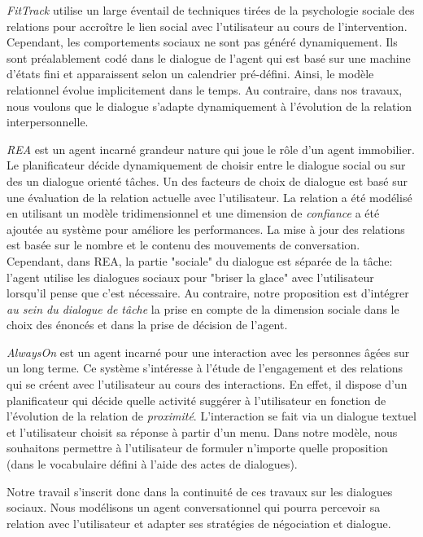 \documentclass [french]{sig-alternate-05-2015}
\begin{document}
\textit{FitTrack} \cite{bickmore2005s} utilise un large éventail de techniques tirées de la psychologie sociale des relations pour accroître le lien social avec l'utilisateur au cours de l'intervention. Cependant, les comportements sociaux ne sont pas généré dynamiquement. Ils sont préalablement codé dans le dialogue de l'agent qui est basé sur une machine d'états fini et apparaissent selon un calendrier pré-défini. Ainsi, le modèle relationnel évolue implicitement dans le temps. Au contraire, dans nos travaux, nous voulons que le dialogue s'adapte dynamiquement à l'évolution de la relation interpersonnelle.

\textit{REA} \cite{bickmore2005establishing} est un agent incarné grandeur nature qui joue le rôle d'un agent immobilier. Le planificateur décide dynamiquement de choisir entre le dialogue social ou sur des un dialogue orienté tâches. Un des facteurs de choix de dialogue est basé sur une évaluation de la relation actuelle avec l'utilisateur. La relation a été modélisé en utilisant un modèle tridimensionnel \cite{svennevig2000getting} et une dimension de \textit{confiance} a été ajoutée au système pour améliore les performances. La mise à jour des relations est basée sur le nombre et le contenu des mouvements de conversation. Cependant, dans REA, la partie "sociale" du dialogue est séparée de la tâche: l'agent utilise les dialogues sociaux pour "briser la glace" avec l'utilisateur lorsqu'il pense que c'est nécessaire. Au contraire, notre proposition est d'intégrer \textit{au sein du dialogue de tâche} la prise en compte de la dimension sociale dans le choix des énoncés et dans la prise de décision de l'agent.

\textit{AlwaysOn} \cite{sidner2013always} est un agent incarné pour une interaction avec les personnes âgées sur un long terme. Ce système s'intéresse à l'étude de l'engagement et des relations qui se créent avec l'utilisateur au cours des interactions. En effet, il dispose d'un planificateur qui décide quelle activité suggérer à l'utilisateur en fonction de l'évolution de la relation de \textit{proximité}. L'interaction se fait via un dialogue textuel et l'utilisateur choisit sa réponse à partir d'un menu. Dans notre modèle, nous souhaitons permettre à l'utilisateur de formuler n'importe quelle proposition (dans le vocabulaire défini à l'aide des actes de dialogues).

Notre travail s'inscrit donc dans la continuité de ces travaux sur les dialogues sociaux. Nous modélisons un agent conversationnel qui pourra percevoir sa relation avec l'utilisateur et adapter ses stratégies de négociation et dialogue.
\end{document}
